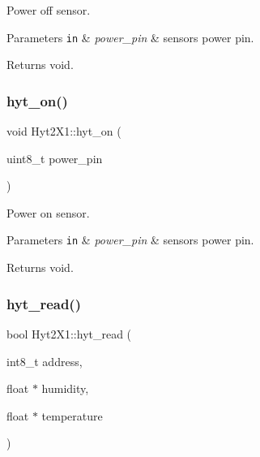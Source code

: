 Power off sensor. 


\begin{DoxyParams}[1]{Parameters}
\mbox{\tt in}  & {\em power\+\_\+pin} & sensors power pin. \\
\hline
\end{DoxyParams}
\begin{DoxyReturn}{Returns}
void. 
\end{DoxyReturn}
\mbox{\label{namespaceHyt2X1_a54218ca8823fdbd3128f658abe6e1e52}} 
\subsubsection{\texorpdfstring{hyt\+\_\+on()}{hyt\_on()}}
{\footnotesize\ttfamily void Hyt2\+X1\+::hyt\+\_\+on (\begin{DoxyParamCaption}\item[{uint8\+\_\+t}]{power\+\_\+pin }\end{DoxyParamCaption})}



Power on sensor. 


\begin{DoxyParams}[1]{Parameters}
\mbox{\tt in}  & {\em power\+\_\+pin} & sensors power pin. \\
\hline
\end{DoxyParams}
\begin{DoxyReturn}{Returns}
void. 
\end{DoxyReturn}
\mbox{\label{namespaceHyt2X1_a69220922c024c6ab149fee8ad4080a5d}} 
\subsubsection{\texorpdfstring{hyt\+\_\+read()}{hyt\_read()}}
{\footnotesize\ttfamily bool Hyt2\+X1\+::hyt\+\_\+read (\begin{DoxyParamCaption}\item[{int8\+\_\+t}]{address,  }\item[{float $\ast$}]{humidity,  }\item[{float $\ast$}]{temperature }\end{DoxyParamCaption})}




